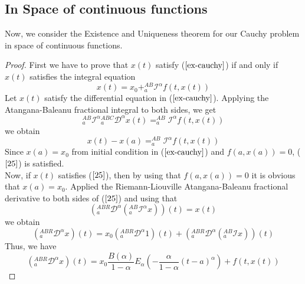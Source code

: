 \documentclass[twoside]{book}
\begin{document}
{\subsection{In Space of continuous functions}
Now, we consider the Existence and Uniqueness theorem for our Cauchy problem in space of continuous functions.
\begin{proof}
    First we have to prove that $x(t)$ satisfy ($\ref{ex-cauchy}$) if and only if $x(t)$ satisfies the integral equation
    \begin{equation}
        \label{25}
        x(t) = x_0 + ^{AB}_{a}\mathscr{I}^{\alpha} f(t,x(t))
    \end{equation}
    Let $x(t)$ satisfy the differential equation in ($\ref{ex-cauchy}$). Applying the Atangana-Baleanu fractional integral to both sides, we get\\
    \begin{equation}
        \label{26}
        {^{AB}_{a}\mathscr{I}^{\alpha}} {^{ABC}_{a}\mathcal{D}^{\alpha}} x(t) = ^{AB}_{a} \mathscr{I}^{\alpha} f(t,x(t))
    \end{equation}
    we obtain
    $$x(t) - x(a) = ^{AB}_{a} \mathscr{I}^{\alpha} f(t,x(t))$$
    Since $x(a) = x_0$ from initial condition in ($\ref{ex-cauchy}$) and $f(a,x(a))=0$, ($\ref{25}$) is satisfied.\\
    Now, if $x(t)$ satisfies ($\ref{25}$), then by using that $f(a,x(a)) = 0$ it is obvious that $x(a) = x_0$. Applied the Riemann-Liouville Atangana-Baleanu fractional derivative to both sides of ($\ref{25}$) and using that
    $$(^{ABR}_{a}\mathcal{D}^{\alpha} (^{AB}_{a}\mathscr{I}^{\alpha} x))(t) = x(t)$$
    we obtain
    \begin{equation}
        \label{28}
        (^{ABR}_{a} \mathcal{D}^{\alpha} x)(t) = x_0 (^{ABR}_{a}\mathcal{D}^{\alpha} 1 )(t) + (^{ABR}_{a}\mathcal{D}^{\alpha} (^{AB}_{a} \mathscr{I}x))(t)
    \end{equation}
    Thus, we have
    \begin{equation}
        \label{29}
        (^{ABR}_{a} \mathcal{D}^{\alpha} x)(t) = x_0 \frac{B(\alpha)}{1-\alpha} E_{\alpha}(- \frac{\alpha}{1-\alpha} (t-a)^{\alpha}) + f(t,x(t))

\end{equation}
\end{proof}}
\end{document}
